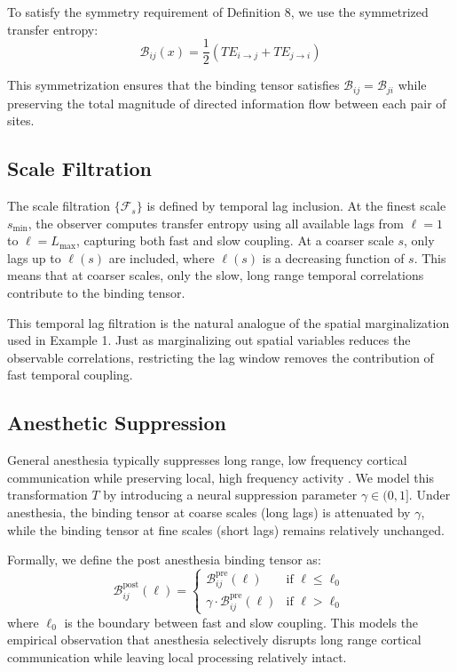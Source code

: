 \documentclass[12pt]{article}
\theoremstyle{definition}
\begin{document}
To satisfy the symmetry requirement of Definition 8, we use the symmetrized transfer entropy:
\begin{equation}
\mathcal{B}_{ij}(x) = \frac{1}{2} \left( TE_{i \to j} + TE_{j \to i} \right)
\end{equation}

This symmetrization ensures that the binding tensor satisfies $\mathcal{B}_{ij} = \mathcal{B}_{ji}$ while preserving the total magnitude of directed information flow between each pair of sites.

\subsection{Scale Filtration}
The scale filtration $\{\mathcal{F}_s\}$ is defined by temporal lag inclusion. At the finest scale $s_{\min}$, the observer computes transfer entropy using all available lags from $\ell = 1$ to $\ell = L_{\max}$, capturing both fast and slow coupling. At a coarser scale $s$, only lags up to $\ell(s)$ are included, where $\ell(s)$ is a decreasing function of $s$. This means that at coarser scales, only the slow, long range temporal correlations contribute to the binding tensor.

This temporal lag filtration is the natural analogue of the spatial marginalization used in Example 1. Just as marginalizing out spatial variables reduces the observable correlations, restricting the lag window removes the contribution of fast temporal coupling.

\subsection{Anesthetic Suppression}
General anesthesia typically suppresses long range, low frequency cortical communication while preserving local, high frequency activity \cite{mashour2014top}. We model this transformation $T$ by introducing a neural suppression parameter $\gamma \in (0, 1]$. Under anesthesia, the binding tensor at coarse scales (long lags) is attenuated by $\gamma$, while the binding tensor at fine scales (short lags) remains relatively unchanged.

Formally, we define the post anesthesia binding tensor as:
\begin{equation}
\mathcal{B}_{ij}^{\text{post}}(\ell) = \begin{cases} \mathcal{B}_{ij}^{\text{pre}}(\ell) & \text{if } \ell \leq \ell_0 \\ \gamma \cdot \mathcal{B}_{ij}^{\text{pre}}(\ell) & \text{if } \ell > \ell_0 \end{cases}
\end{equation}
where $\ell_0$ is the boundary between fast and slow coupling. This models the empirical observation that anesthesia selectively disrupts long range cortical communication while leaving local processing relatively intact.
\end{document}
